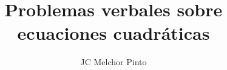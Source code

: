 \documentclass[12pt,addpoints,answers]{guia}
\title{Problemas verbales sobre ecuaciones cuadráticas}
\author{JC Melchor Pinto}
\begin{document}
\pagestyle{headandfoot}
\INFO%
\begin{multicols}{2}%
\end{multicols}%
\begin{questions}
    \questionboxed[10]{}
    \questionboxed[15]{}
    \questionboxed[15]{}
    \questionboxed[15]{}
    \questionboxed[15]{}
    \questionboxed[15]{}
    \questionboxed[15]{}
\end{questions}
\end{document}
